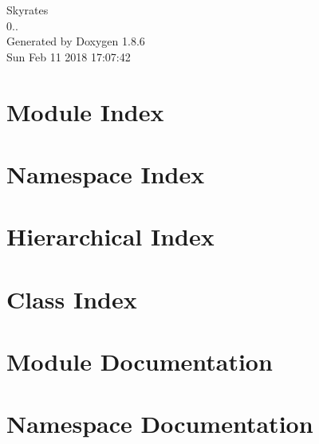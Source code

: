 \documentclass[twoside]{book}
\newcommand{\clearemptydoublepage}{%
  \newpage{\pagestyle{empty}\cleardoublepage}%
}
\begin{document}
\hypersetup{pageanchor=false}
\begin{titlepage}
\vspace*{7cm}
\begin{center}%
{\Large Skyrates \\[1ex]\large 0.. }\\
\vspace*{1cm}
{\large Generated by Doxygen 1.8.6}\\
\vspace*{0.5cm}
{\small Sun Feb 11 2018 17:07:42}\\
\end{center}
\end{titlepage}
\clearemptydoublepage
\tableofcontents
\clearemptydoublepage
{}
\hypersetup{pageanchor=true}

\chapter{Module Index}

\chapter{Namespace Index}

\chapter{Hierarchical Index}

\chapter{Class Index}

\chapter{Module Documentation}




\chapter{Namespace Documentation}





















\end{document}
